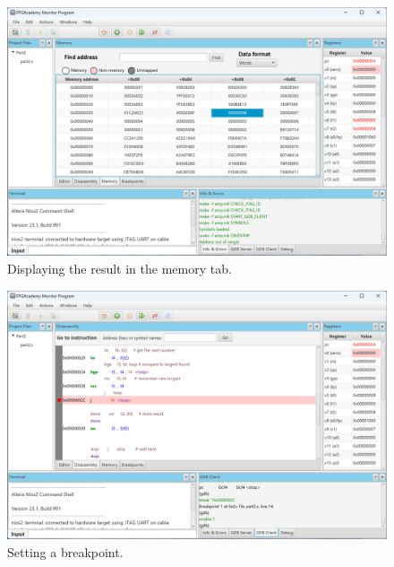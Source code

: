 \documentclass[epsfig,10pt,fullpage]{article}
\newcommand{\CommonDocsPath}{../../../../common/docs}
\begin{document}
\begin{enumerate}
\begin{figure}[H]
	\begin{center}
	\includegraphics[scale=0.3]{figures/memory.png}
	\end{center}
	\vspace{-0.5cm}\caption{Displaying the result in the memory tab.}
\label{fig:MP_mem}
\end{figure} 

\begin{figure}[H]
	\begin{center}
	\includegraphics[scale=0.3]{figures/break.png}
	\end{center}
	\vspace{-0.5cm}\caption{Setting a breakpoint.}
\label{fig:MP13}
\end{figure} 

\end{enumerate}


\end{document}
